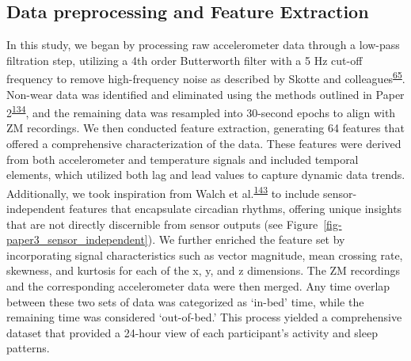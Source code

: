 \documentclass[
  10pt,
]{scrbook}
\begin{document}
\hypertarget{data-preprocessing-and-feature-extraction}{%
\subsection{Data preprocessing and Feature
Extraction}\label{data-preprocessing-and-feature-extraction}}

In this study, we began by processing raw accelerometer data through a
low-pass filtration step, utilizing a 4th order Butterworth filter with
a 5 Hz cut-off frequency to remove high-frequency noise as described by
Skotte and
colleagues\textsuperscript{\protect\hyperlink{ref-skotte_detection_2014}{65}}.
Non-wear data was identified and eliminated using the methods outlined
in Paper
2\textsuperscript{\protect\hyperlink{ref-skovgaard_generalizability_2023}{134}},
and the remaining data was resampled into 30-second epochs to align with
ZM recordings. We then conducted feature extraction, generating 64
features that offered a comprehensive characterization of the data.
These features were derived from both accelerometer and temperature
signals and included temporal elements, which utilized both lag and lead
values to capture dynamic data trends. Additionally, we took inspiration
from Walch et
al.\textsuperscript{\protect\hyperlink{ref-walch_sleep_2019}{143}} to
include sensor-independent features that encapsulate circadian rhythms,
offering unique insights that are not directly discernible from sensor
outputs (see Figure~\ref{fig-paper3_sensor_independent}). We further
enriched the feature set by incorporating signal characteristics such as
vector magnitude, mean crossing rate, skewness, and kurtosis for each of
the x, y, and z dimensions. The ZM recordings and the corresponding
accelerometer data were then merged. Any time overlap between these two
sets of data was categorized as `in-bed' time, while the remaining time
was considered `out-of-bed.' This process yielded a comprehensive
dataset that provided a 24-hour view of each participant's activity and
sleep patterns.
\end{document}
